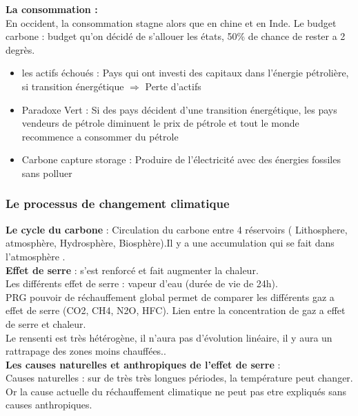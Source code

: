 \documentclass{article}
\begin{document}
\textbf{La consommation :}  \\
En occident, la consommation stagne alors que en chine et en Inde. 
Le budget carbone : budget qu'on décidé de s'allouer les états,  50\% de chance de rester a 2 degrès.
\begin{itemize}
	\item les actifs échoués : Pays qui ont investi des capitaux dans l'énergie pétrolière, si transition énergétique $\Rightarrow$ Perte d'actifs
	\item Paradoxe Vert : Si des pays décident d'une transition énergétique, les pays vendeurs de pétrole diminuent le prix de pétrole et tout le monde recommence a consommer du pétrole
	\item Carbone capture storage : Produire de l'électricité avec des énergies fossiles sans polluer
\end{itemize}

\subsubsection{Le processus de changement climatique}
\textbf{Le cycle du carbone} : Circulation du carbone entre 4 réservoirs ( Lithosphere, atmosphère, Hydrosphère, Biosphère).Il y a une accumulation qui se fait dans l'atmosphère . \\
\textbf{Effet de serre} : s'est renforcé et fait augmenter la chaleur.\\
Les différents effet de serre : vapeur d'eau (durée de vie de 24h). \\
PRG pouvoir de réchauffement global permet de comparer les différents gaz a effet de serre (CO2, CH4, N2O, HFC). 
Lien entre la concentration de gaz a effet de serre et chaleur. \\
Le rensenti est très hétérogène, il n'aura pas d'évolution linéaire, il y aura un rattrapage des zones moins chauffées.. \\

\textbf{Les causes naturelles et anthropiques de l'effet de serre} : \\
Causes naturelles :  sur de très très longues périodes, la température peut changer. Or la cause actuelle du réchauffement climatique ne peut pas etre expliqués sans causes anthropiques.\\
\end{document}
